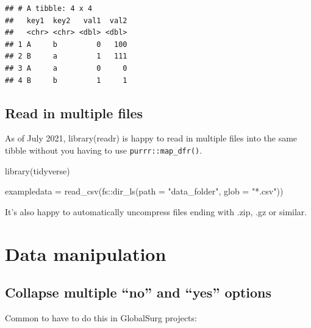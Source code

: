 \documentclass[
]{book}
\newenvironment{Shaded}{\begin{snugshade}}{\end{snugshade}}
\newcommand{\AttributeTok}[1]{\textcolor[rgb]{0.77,0.63,0.00}{#1}}
\newcommand{\FunctionTok}[1]{\textcolor[rgb]{0.00,0.00,0.00}{#1}}
\newcommand{\NormalTok}[1]{#1}
\newcommand{\OtherTok}[1]{\textcolor[rgb]{0.56,0.35,0.01}{#1}}
\newcommand{\SpecialCharTok}[1]{\textcolor[rgb]{0.00,0.00,0.00}{#1}}
\newcommand{\StringTok}[1]{\textcolor[rgb]{0.31,0.60,0.02}{#1}}
\begin{document}
\begin{verbatim}
## # A tibble: 4 x 4
##   key1  key2   val1  val2
##   <chr> <chr> <dbl> <dbl>
## 1 A     b         0   100
## 2 B     a         1   111
## 3 A     a         0     0
## 4 B     b         1     1
\end{verbatim}

\hypertarget{read-in-multiple-files}{%
\section{Read in multiple files}\label{read-in-multiple-files}}

As of July 2021, library(readr) is happy to read in multiple files into the same tibble without you having to use \texttt{purrr::map\_dfr()}.

\begin{Shaded}
\begin{Highlighting}[]
\FunctionTok{library}\NormalTok{(tidyverse)}

\NormalTok{exampledata }\OtherTok{=} \FunctionTok{read\_csv}\NormalTok{(fs}\SpecialCharTok{::}\FunctionTok{dir\_ls}\NormalTok{(}\AttributeTok{path =} \StringTok{"data\_folder"}\NormalTok{, }\AttributeTok{glob =} \StringTok{"*.csv"}\NormalTok{))}
\end{Highlighting}
\end{Shaded}

It's also happy to automatically uncompress files ending with .zip, .gz or similar.

\hypertarget{data-manipulation}{%
\chapter{Data manipulation}\label{data-manipulation}}

\hypertarget{collapse-multiple-no-and-yes-options}{%
\section{Collapse multiple ``no'' and ``yes'' options}\label{collapse-multiple-no-and-yes-options}}

Common to have to do this in GlobalSurg projects:
\end{document}
